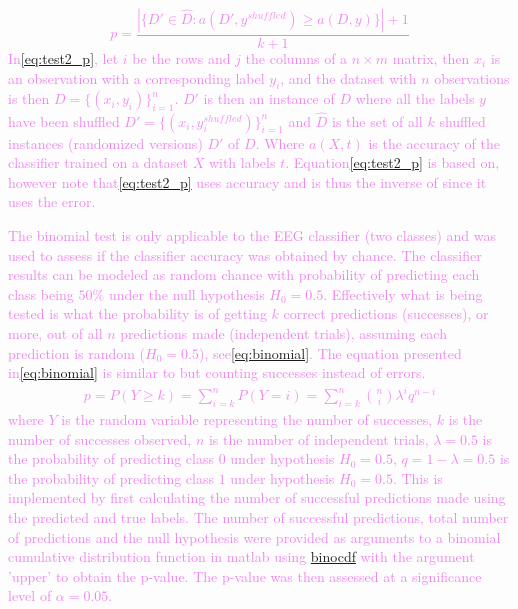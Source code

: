 \textcolor{violet}{
	\begin{dmath}
		\label{eq:test2_p}
		p = \frac{|\{D'\in\hat{D}: a(D',y^{shuffled}) \ge a(D,y)\}|+1}{k+1}
	\end{dmath}}
\textcolor{violet}{In\:\eqref{eq:test2_p}, let $i$ be the rows and $j$ the columns of a $n \times m$ matrix, then $x_i$ is an observation with a corresponding label $y_i$, and the dataset with $n$ observations is then $D = \{(x_i, y_i)\}_{i = 1}^{n}$\:\cite{ariasClassifierSelectionPermutation2017}. $D'$ is then an instance of $D$ where all the labels $y$ have been shuffled $D' = \{(x_i, y_i^{shuffled})\}_{i = 1}^{n}$ and $\hat{D}$ is the set of all $k$ shuffled instances (randomized versions) $D'$ of $D$\:\cite{ariasClassifierSelectionPermutation2017}.
Where $a(X,t)$ is the accuracy of the classifier trained on a dataset $X$ with labels $t$.
Equation\:\eqref{eq:test2_p} is based on\:\cite{ojalaPermutationTestsStudying2009},  however note that\:\eqref{eq:test2_p} uses accuracy and is thus the inverse of\:\cite{ojalaPermutationTestsStudying2009} since it uses the error.}


\textcolor{violet}{The binomial test is only applicable to the EEG classifier (two classes)\:\cite{howellStatisticalMethodsPsychology2007} and was used to assess if the classifier accuracy was obtained by chance\:\cite{noirhommeBiasedBinomialAssessment2014}.
	The classifier results can be modeled as random chance with probability of predicting each class being $50\%$ under the null hypothesis $H_0 = 0.5$\:\cite{ganzPermutationTestsClassification2017}\cite{noirhommeBiasedBinomialAssessment2014}. 
	Effectively what is being tested is what the probability is of getting $k$ correct predictions (successes), or more, out of all $n$ predictions made (independent trials), assuming each prediction is random ($H_0 = 0.5$), see\:\eqref{eq:binomial}. The equation presented in\:\eqref{eq:binomial} is similar to\:\cite{ganzPermutationTestsClassification2017} but counting successes instead of errors.
	\begin{equation}
		\begin{split}
			\label{eq:binomial}
			p = P(Y\ge k) = \sum_{i = k}^{n}P(Y = i) = \sum_{i = k}^{n} \binom{n}{i} \lambda^iq^{n-i}
		\end{split}
	\end{equation}
	where $Y$ is the random variable representing the number of successes, $k$ is the number of successes observed, $n$ is the number of independent trials, $\lambda = 0.5$ is the probability of predicting class $0$ under hypothesis $H_0 = 0.5$, $q = 1 - \lambda = 0.5$ is the probability of predicting class $1$ under hypothesis $H_0 = 0.5$.
	This is implemented by first calculating the number of successful predictions made using the predicted and true labels. The number of successful predictions, total number of predictions and the null hypothesis were provided as arguments to a binomial cumulative distribution function in matlab using \href{https://se.mathworks.com/help/stats/binocdf.html}{binocdf} with the argument 'upper' to obtain the p-value. The p-value was then assessed at a significance level of $\alpha = 0.05$.}

